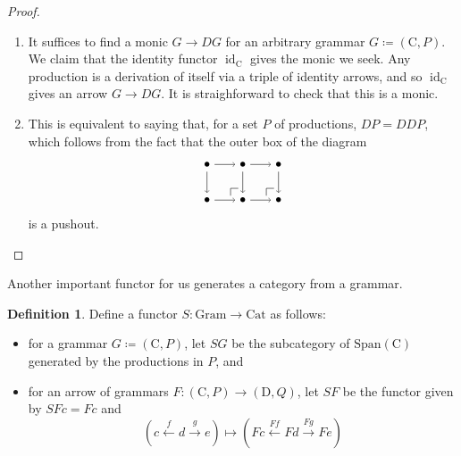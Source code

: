 \documentclass{amsart}
\newcommand{\C}{\cat{C}}
\newcommand{\D}{\cat{D}}
\newcommand{\Cat}{\cat{Cat}}
\newcommand{\Gram}{\cat{Gram}}
\newcommand{\Span}[1]{\cat{Span}(#1)}
\newcommand{\cat}[1]{\mathrm{#1}}
\newcommand{\from}{\colon}
\newcommand{\xto}[1]{\xrightarrow{#1}}
\newcommand{\xgets}[1]{\xleftarrow{#1}}
\DeclareMathOperator{\id}{id}
\theoremstyle{remark}
\theoremstyle{definition}
\newtheorem{definition}[theorem]{Definition}
\begin{document}
\begin{proof}
  
  \begin{enumerate}
  \item It suffices to find a monic $ G \to DG $ for an arbitrary
    grammar $ G \coloneqq ( \C , P ) $. We claim that the identity
    functor $ \id_{\C} $ gives the monic we seek. Any production is a
    derivation of itself via a triple of identity arrows, and so
    $ \id_{\C} $ gives an arrow $ G \to DG $. It is straighforward to
    check that this is a monic.
  \item This is equivalent to saying that, for a set $ P $ of
    productions, $ DP = DDP $, which follows from the fact that the
    outer box of the diagram
    \[
      \begin{tikzpicture}
        \node (1) at (0,1) {\( \bullet \)};
        \node (2) at (1,1) {\( \bullet \)};
        \node (3) at (2,1) {\( \bullet \)};
        \node (4) at (0,0) {\( \bullet \)};
        \node (5) at (1,0) {\( \bullet \)};
        \node (6) at (2,0) {\( \bullet \)};
        \draw [->] (1) to node [] {\scriptsize{\(  \)}} (2);
        \draw [->] (2) to node [] {\scriptsize{\(  \)}} (3);
        \draw [->] (4) to node [] {\scriptsize{\(  \)}} (5);
        \draw [->] (5) to node [] {\scriptsize{\(  \)}} (6);
        \draw [->] (1) to node [] {\scriptsize{\(  \)}} (4);
        \draw [->] (2) to node [] {\scriptsize{\(  \)}} (5);
        \draw [->] (3) to node [] {\scriptsize{\(  \)}} (6);
        \node (a) at (0.66,0) {};
        \node (b) at (0.66,0.33) {};
        \node (c) at (1,0.33) {};
        \node (d) at (1.66,0) {};
        \node (e) at (1.66,0.33) {};
        \node (f) at (2,0.33) {};
        \draw (a) -- (b.center);
        \draw (b.center) -- (c);
        \draw (d) -- (e.center);
        \draw (e.center) -- (f);
      \end{tikzpicture}
    \]
    is a pushout.
  \end{enumerate}
  
\end{proof}

Another important functor for us generates a category from a grammar.

\begin{definition} 

  Define a functor $ S \from \Gram \to \Cat $ as follows:
  \begin{itemize}
  \item for a grammar $ G \coloneqq ( \C , P ) $, let $ SG $ be the
    subcategory of $ \Span{ \C } $ generated by the productions in $ P
    $, and
  \item for an arrow of grammars
    $ F \from ( \C , P ) \to ( \D , Q ) $, let $ SF $ be the functor
    given by $ SFc = Fc $ and
    \[
      ( c \xgets{f} d \xto{g} e )
      \mapsto
      ( Fc \xgets{Ff} Fd \xto{Fg} Fe )
    \]
  \end{itemize}

\end{definition}
\end{document}
